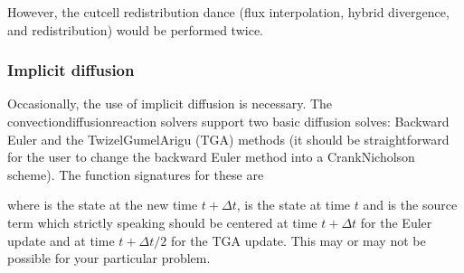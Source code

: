 \documentclass[letterpaper,10pt,english]{sphinxmanual}
\begin{document}
However, the cut\sphinxhyphen{}cell redistribution dance (flux interpolation, hybrid divergence, and redistribution) would be performed twice.


\subsubsection{Implicit diffusion}
\label{\detokenize{CDR:implicit-diffusion}}\label{\detokenize{CDR:chap-implicitdiffusion}}
Occasionally, the use of implicit diffusion is necessary.
The convection\sphinxhyphen{}diffusion\sphinxhyphen{}reaction solvers support two basic diffusion solves:
Backward Euler and the Twizel\sphinxhyphen{}Gumel\sphinxhyphen{}Arigu (TGA) methods (it should be straightforward for the user to change the backward Euler method into a Crank\sphinxhyphen{}Nicholson scheme).
The function signatures for these are

\begin{sphinxVerbatim}[commandchars=\\\{\},formatcom=\scriptsize]
           
             

        
          
\end{sphinxVerbatim}

where  is the state at the new time \(t + \Delta t\),  is the state at time \(t\) and  is the source term which strictly speaking should be centered at time \(t + \Delta t\) for the Euler update and at time \(t + \Delta t/2\) for the TGA update.
This may or may not be possible for your particular problem.
\end{document}
